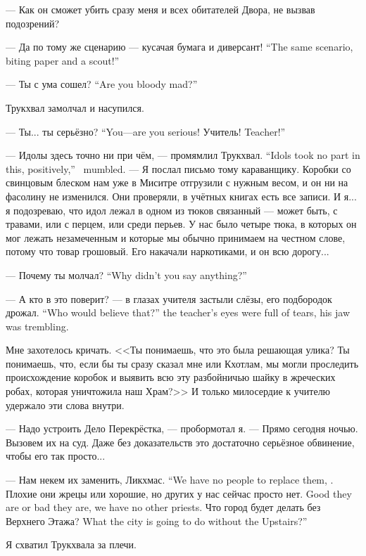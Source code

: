 --- Как он сможет убить сразу меня и всех обитателей Двора, не вызвав подозрений?

{--- Да по тому же сценарию --- кусачая бумага и диверсант!}
{``The same scenario, biting paper and a scout!''}

{--- Ты с ума сошел?}
{``Are you bloody mad?''}

Трукхвал замолчал и насупился.

{--- Ты... ты серьёзно?}
{``You---are you serious!}
{Учитель!}
{Teacher!''}

{--- Идолы здесь точно ни при чём, --- промямлил Трукхвал.}
{``Idols took no part in this, positively,'' \Trukchual\ mumbled.}
--- Я послал письмо тому караванщику.
Коробки со свинцовым блеском нам уже в Миситре отгрузили с нужным весом, и он ни на фасолину не изменился.
Они проверяли, в учётных книгах есть все записи.
И я... я подозреваю, что идол лежал в одном из тюков связанный --- может быть, с травами, или с перцем, или среди перьев.
У нас было четыре тюка, в которых он мог лежать незамеченным и которые мы обычно принимаем на честном слове, потому что товар грошовый.
Его накачали наркотиками, и он всю дорогу...

{--- Почему ты молчал?}
{``Why didn't you say anything?''}

{--- А кто в это поверит? --- в глазах учителя застыли слёзы, его подбородок дрожал.}
{``Who would believe that?'' the teacher's eyes were full of tears, his jaw was trembling.}

Мне захотелось кричать.
<<Ты понимаешь, что это была решающая улика?
Ты понимаешь, что, если бы ты сразу сказал мне или Кхотлам, мы могли проследить происхождение коробок и выявить всю эту разбойничью шайку в жреческих робах, которая уничтожила наш Храм?>>
И только милосердие к учителю удержало эти слова внутри.

--- Надо устроить Дело Перекрёстка, --- пробормотал я.
--- Прямо сегодня ночью.
Вызовем их на суд.
Даже без доказательств это достаточно серьёзное обвинение, чтобы его так просто...

{--- Нам некем их заменить, Ликхмас.}
{``We have no people to replace them, \Likchmas.}
{Плохие они жрецы или хорошие, но других у нас сейчас просто нет.}
{Good they are or bad they are, we have no other priests.}
{Что город будет делать без Верхнего Этажа?}
{What the city is going to do without the Upstairs?''}

Я схватил Трукхвала за плечи.

